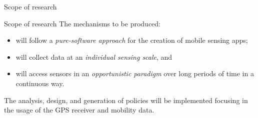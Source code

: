 
\begin{frame}{Scope of research}
  \begin{exampleblock}{Scope of research}
    The mechanisms to be produced:
    \begin{itemize}
      \item will follow a \emph{pure-software approach} for the creation of mobile sensing apps;
      \item will collect data at an \emph{individual sensing scale}, and
      \item will access sensors in an \emph{opportunistic paradigm} over long periods of time in a continuous way.
    \end{itemize}

    The analysis, design, and generation of policies will be implemented focusing in the usage of the GPS receiver and mobility data.
  \end{exampleblock}
\end{frame}